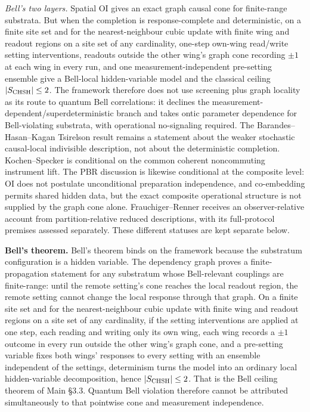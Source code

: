 \documentclass[
]{article}
\begin{document}
\emph{Bell's two layers.} Spatial OI gives an exact graph causal cone
for finite-range substrata. But when the completion is response-complete
and deterministic, on a finite site set and for the nearest-neighbour
cubic update with finite wing and readout regions on a site set of any
cardinality, one-step own-wing read/write setting interventions,
readouts outside the other wing's graph cone recording \(\pm1\) at each
wing in every run, and one measurement-independent pre-setting ensemble
give a Bell-local hidden-variable model and the classical ceiling
\(|S_{\rm CHSH}|\le2\). The framework therefore does not use screening
plus graph locality as its route to quantum Bell correlations: it
declines the measurement-dependent/superdeterministic branch and takes
ontic parameter dependence for Bell-violating substrata, with
operational no-signaling required. The Barandes--Hasan--Kagan Tsirelson
result remains a statement about the weaker stochastic causal-local
indivisible description, not about the deterministic completion.
Kochen--Specker is conditional on the common coherent noncommuting
instrument lift. The PBR discussion is likewise conditional at the
composite level: OI does not postulate unconditional preparation
independence, and co-embedding permits shared hidden data, but the exact
composite operational structure is not supplied by the graph cone alone.
Frauchiger--Renner receives an observer-relative account from
partition-relative reduced descriptions, with its full-protocol premises
assessed separately. These different statuses are kept separate below.

\textbf{Bell's theorem.} Bell's theorem binds on the framework because
the substratum configuration is a hidden variable. The dependency graph
proves a finite-propagation statement for any substratum whose
Bell-relevant couplings are finite-range: until the remote setting's
cone reaches the local readout region, the remote setting cannot change
the local response through that graph. On a finite site set and for the
nearest-neighbour cubic update with finite wing and readout regions on a
site set of any cardinality, if the setting interventions are applied at
one step, each reading and writing only its own wing, each wing records
a \(\pm1\) outcome in every run outside the other wing's graph cone, and
a pre-setting variable fixes both wings' responses to every setting with
an ensemble independent of the settings, determinism turns the model
into an ordinary local hidden-variable decomposition, hence
\(|S_{\rm CHSH}|\le2\). That is the Bell ceiling theorem of Main §3.3.
Quantum Bell violation therefore cannot be attributed simultaneously to
that pointwise cone and measurement independence.
\end{document}
